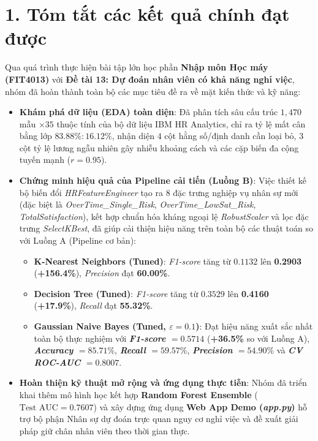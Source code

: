 
\section*{1. Tóm tắt các kết quả chính đạt được}
Qua quá trình thực hiện bài tập lớn học phần \textbf{Nhập môn Học máy (FIT4013)} với \textbf{Đề tài 13: Dự đoán nhân viên có khả năng nghỉ việc}, nhóm đã hoàn thành toàn bộ các mục tiêu đề ra về mặt kiến thức và kỹ năng:
\begin{itemize}
    \item \textbf{Khám phá dữ liệu (EDA) toàn diện}: Đã phân tích sâu cấu trúc $1,470$ mẫu $\times 35$ thuộc tính của bộ dữ liệu IBM HR Analytics, chỉ ra tỷ lệ mất cân bằng lớp $83.88\% : 16.12\%$, nhận diện $4$ cột hằng số/định danh cần loại bỏ, $3$ cột tỷ lệ lương ngẫu nhiên gây nhiễu khoảng cách và các cặp biến đa cộng tuyến mạnh ($r = 0.95$).
    \item \textbf{Chứng minh hiệu quả của Pipeline cải tiến (Luồng B)}: Việc thiết kế bộ biến đổi \textit{HRFeatureEngineer} tạo ra $8$ đặc trưng nghiệp vụ nhân sự mới (đặc biệt là \textit{OverTime\_Single\_Risk}, \textit{OverTime\_LowSat\_Risk}, \textit{TotalSatisfaction}), kết hợp chuẩn hóa kháng ngoại lệ \textit{RobustScaler} và lọc đặc trưng \textit{SelectKBest}, đã giúp cải thiện hiệu năng trên toàn bộ các thuật toán so với Luồng A (Pipeline cơ bản):
    \begin{itemize}
        \item \textbf{K-Nearest Neighbors (Tuned)}: \textit{F1-score} tăng từ $0.1132$ lên \textbf{0.2903} (\textbf{+156.4\%}), \textit{Precision} đạt \textbf{60.00\%}.
        \item \textbf{Decision Tree (Tuned)}: \textit{F1-score} tăng từ $0.3529$ lên \textbf{0.4160} (\textbf{+17.9\%}), \textit{Recall} đạt \textbf{55.32\%}.
        \item \textbf{Gaussian Naive Bayes (Tuned, $\varepsilon = 0.1$)}: Đạt hiệu năng xuất sắc nhất toàn bộ thực nghiệm với \textbf{\textit{F1-score} $= 0.5714$} (\textbf{+36.5\%} so với Luồng A), \textbf{\textit{Accuracy} $= 85.71\%$}, \textbf{\textit{Recall} $= 59.57\%$}, \textbf{\textit{Precision} $= 54.90\%$} và \textbf{\textit{CV ROC-AUC} $= 0.8007$}.
    \end{itemize}
    \item \textbf{Hoàn thiện kỹ thuật mở rộng và ứng dụng thực tiễn}: Nhóm đã triển khai thêm mô hình học kết hợp \textbf{Random Forest Ensemble} ($\text{Test AUC} = 0.7607$) và xây dựng ứng dụng \textbf{Web App Demo (\textit{app.py})} hỗ trợ bộ phận Nhân sự dự đoán trực quan nguy cơ nghỉ việc và đề xuất giải pháp giữ chân nhân viên theo thời gian thực.
\end{itemize}

